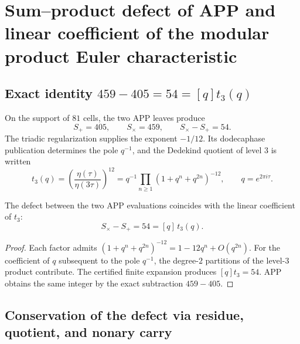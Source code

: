 
\section{Sum--product defect of APP and linear coefficient of the modular product Euler characteristic}
\label{sec:l9s102:euler-defecto}

\subsection{Exact identity \texorpdfstring{\(459-405=54=[q]t_3(q)\)}{459-405=54=[q]t3(q)}}

On the support of \(81\) cells, the two APP leaves produce
\begin{equation}
 S_+=405,
 \qquad
 S_\times=459,
 \qquad
 S_\times-S_+=54.
 \label{eq:l9s102:euler-405-459}
\end{equation}
The triadic regularization supplies the exponent \(-1/12\). Its
dodecaphase publication determines the pole \(q^{-1}\), and the Dedekind quotient
of level \(3\) is written
\begin{equation}
 t_3(q)
 =\left(\frac{\eta(\tau)}{\eta(3\tau)}\right)^{12}
 =q^{-1}\prod_{n\ge1}(1+q^n+q^{2n})^{-12},
 \qquad q=e^{2\pi i\tau}.
 \label{eq:l9s102:euler-t3}
\end{equation}

\begin{theorem}
\label{thm:l9s102:euler-54}
The defect between the two APP evaluations coincides with the linear
coefficient of \(t_3\):
\begin{equation}
 \boxed{
 S_\times-S_+=54=[q]\,t_3(q).}
 \label{eq:l9s102:euler-54}
\end{equation}
\end{theorem}

\begin{proof}
Each factor admits
\((1+q^n+q^{2n})^{-12}=1-12q^n+O(q^{2n})\). For the coefficient of
\(q\) subsequent to the pole \(q^{-1}\), the degree-\(2\) partitions
of the level-\(3\) product contribute. The certified finite expansion produces
\([q]t_3=54\). APP obtains the same integer by the exact subtraction
\(459-405\).
\end{proof}

\subsection{Conservation of the defect via residue, quotient, and nonary carry}


